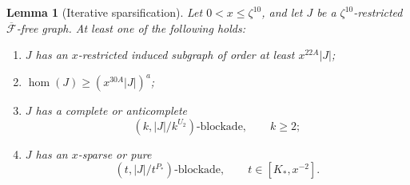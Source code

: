 \documentclass[11pt]{article}
\numberwithin{equation}{section}
\theoremstyle{plain}
\newtheorem{lemma}[theorem]{Lemma}
\theoremstyle{definition}
\begin{document}
\begin{lemma}[Iterative sparsification]
\label{lem:hjz-modified-iterative}
Let $0<x\leq\zeta^{10}$, and let $J$ be a
$\zeta^{10}$-restricted $\overline{\mathcal F}$-free graph.  At least
one of the following holds:
\begin{enumerate}
\item $J$ has an $x$-restricted induced subgraph of order at least
      $x^{22A}|J|$;
\item $\operatorname{hom}(J)\geq(x^{30A}|J|)^a$;
\item $J$ has a complete or anticomplete
\[
                    (k,|J|/k^{U_2})\text{-blockade},
                    \qquad k\geq2;
\]
\item $J$ has an $x$-sparse or pure
\[
                    (t,|J|/t^{P_*})\text{-blockade},
                    \qquad t\in[K_*,x^{-2}].
\]
\end{enumerate}
\end{lemma}
\end{document}
